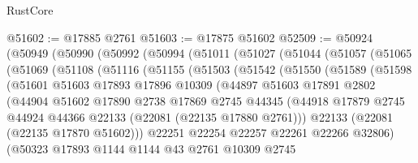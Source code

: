 \begin{lexlean}{RustCore}
\begin{coremodule}
@51602 := @17885 @2761
@51603 := @17875 @51602
@52509 := @50924
    (@50949
      (@50990
        (@50992
          (@50994
            (@51011
              (@51027
                (@51044
                  (@51057
                    (@51065
                      (@51069
                        (@51108
                          (@51116
                            (@51155
                              (@51503
                                (@51542
                                  (@51550
                                    (@51589
                                      (@51598
                                        (@51601
                                          @51603
                                          @17893
                                          @17896
                                          @10309
                                          (@44897
                                            @51603
                                            @17891
                                            @2802
                                            (@44904
                                              @51602
                                              @17890
                                              @2738
                                              @17869
                                              @2745
                                              @44345
                                              (@44918
                                                @17879
                                                @2745
                                                @44924
                                                @44366
                                                @22133
                                                (@22081 (@22135 @17880 @2761)))
                                              @22133
                                              (@22081 (@22135 @17870 @51602)))
                                            @22251
                                            @22254
                                            @22257
                                            @22261
                                            @22266
                                            @32806)
                                          (@50323
                                            @17893
                                            @1144
                                            @1144
                                            @43
                                            @2761
                                            @10309
                                            @2745

\end{coremodule}
\end{lexlean}
